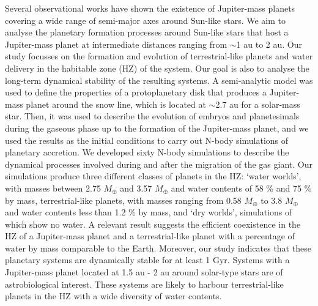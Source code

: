 \documentclass{aa}
\begin{document}
\abstract
{Several observational works have shown the existence of Jupiter-mass planets covering a wide range of semi-major axes around
Sun-like stars.
}
{We aim to analyse the planetary formation processes around Sun-like stars that host a Jupiter-mass planet at
intermediate distances ranging from $\sim$1 au to 2 au. Our study focusses on the formation and evolution of terrestrial-like
planets and water delivery in the habitable zone (HZ) of the system. Our goal is also to analyse the long-term dynamical
stability of the resulting systems.
}
{A semi-analytic model was used to define the properties of a protoplanetary disk that produces a Jupiter-mass planet around the snow line, which is located at $\sim$2.7 au for a solar-mass star. Then, it was used to describe the evolution of embryos and planetesimals during the gaseous phase up to the formation of the Jupiter-mass planet, and we used the results as the initial conditions to carry out N-body simulations of planetary accretion. We developed sixty N-body simulations to describe the dynamical processes involved during and after the migration of the gas giant.
}
{Our simulations produce three different classes of planets in the HZ: `water worlds', with masses between 2.75 $M_{\oplus}$ and 3.57 $M_{\oplus}$ and water contents of 58 \% and 75 \% by mass, terrestrial-like planets, with masses ranging from 0.58 $M_{\oplus}$ to 3.8 $M_{\oplus}$ and water contents less than 1.2 \% by mass, and `dry worlds', simulations of which show no water.
A relevant result suggests the efficient coexistence in the HZ of a Jupiter-mass planet and a terrestrial-like planet with a percentage
of water by mass comparable to the Earth. Moreover, our study indicates that these planetary systems are dynamically stable
for at least 1 Gyr.
}
{Systems with a Jupiter-mass planet located at 1.5 au - 2 au around solar-type stars are of astrobiological interest.
These systems are likely to harbour terrestrial-like planets in the HZ with a wide diversity of water contents.
}



\maketitle
\end{document}
